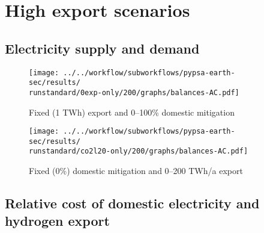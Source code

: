 \section{High export scenarios}
\label{sec:highexportsens}
\subsection{Electricity supply and demand}


\begin{figure*}[h!]
    \centering
    \begin{subfigure}[b]{0.49\linewidth}
        \centering
        \texttt{[image: ../../workflow/subworkflows/pypsa-earth-sec/results/\\runstandard/0exp-only/200/graphs/balances-AC.pdf]}
        \caption{Fixed (1 TWh) export and 0--100\% domestic mitigation}
        \label{fig:balances-ac-0exp}
    \end{subfigure}
    \hfill
    \begin{subfigure}[b]{0.49\linewidth}
        \centering
        \texttt{[image: ../../workflow/subworkflows/pypsa-earth-sec/results/\\runstandard/co2l20-only/200/graphs/balances-AC.pdf]}
        \caption{Fixed (0\%) domestic mitigation and 0--200 TWh/a export}
        \label{fig:balances-ac-co2l20-200}
    \end{subfigure}
    \hfill
    \caption{Electricity supply and demand at fixed export levels and increasing domestic mitigation export (\ref{fig:balances-ac-0exp}) and vice versa (\ref{fig:balances-ac-co2l20-200}). Increasing domestic mitigation first phases out carbon-intensive coal generation in favor of CCGT, at medium to high mitigation the electricity system is fully renewable supported by flexibility through Vehicle-to-Grid (V2G) and sector coupling. Increasing electricity demands cover EVs and hydrogen generation for other sectors.
    At increasing hydrogen exports the additional electricity required for hydrogen electrolysis is covered by onshore wind and solar PV, as imposed by the hydrogen regulation. 
    }
    \label{fig:balances-ac}
\end{figure*}





\subsection{Relative cost of domestic electricity and hydrogen export}

